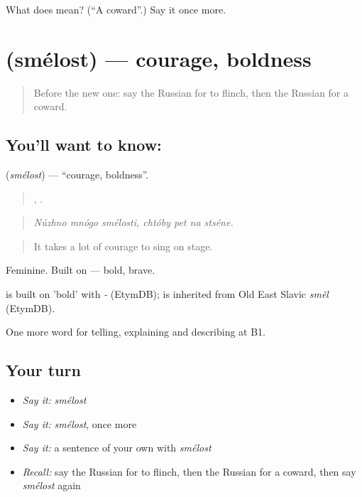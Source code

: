 \begin{tcolorbox}[breakable,colback=teal!4,colframe=teal!35!black,title={Before you move on}]
What does  mean? (\textquotedblleft{}A coward\textquotedblright{}.) Say it once more.
\end{tcolorbox}
\section[\texorpdfstring{\ru{смелость} (smélost)}{смелость (smélost)}]{ (smélost) — courage, boldness}

\label{lesson:RU-C476-smelost}



\begin{quote}
Before the new one: say the Russian for to flinch, then the Russian for a coward.
\end{quote}

\subsection*{You'll want to know: }
\textbf{} (\emph{smélost}) — \textquotedblleft{}courage, boldness\textquotedblright{}.

\begin{quote}
  ,    .
\end{quote}

\begin{quote}
\emph{Núzhno mnógo smélosti, chtóby pet na stséne.}
\end{quote}

\begin{quote}
It takes a lot of courage to sing on stage.
\end{quote}

Feminine. Built on \emph{} — bold, brave.

\begin{cousinweb}
\emph{} is built on \emph{} 'bold' with \emph{-} (EtymDB); \emph{} is inherited from Old East Slavic \emph{směl} (EtymDB).
\end{cousinweb}

\begin{grammarlens}[title={What you've built}]
One more word for telling, explaining and describing at B1.
\end{grammarlens}

\subsection*{Your turn}
\begin{itemize}
\raggedright
  \item \emph{Say it:} \emph{smélost}
  \item \emph{Say it:} \emph{smélost}, once more
  \item \emph{Say it:} a sentence of your own with \emph{smélost}
  \item \emph{Recall:} say the Russian for to flinch, then the Russian for a coward, then say \emph{smélost} again
\end{itemize}

